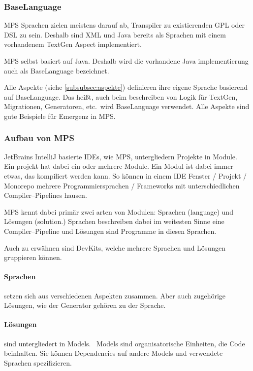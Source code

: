 \subsubsection{BaseLanguage}
\ac{MPS} Sprachen zielen meistens darauf ab, Transpiler zu existierenden \ac{GPL} oder \ac{DSL} zu sein.
Deshalb sind \ac{XML} und Java bereits als Sprachen mit einem vorhandenem TextGen Aspect implementiert.

\ac{MPS} selbst basiert auf Java.
Deshalb wird die vorhandene Java implementierung auch als BaseLanguage bezeichnet.

Alle Aspekte (siehe \autoref{subsubsec:aspekte}) definieren ihre eigene Sprache basierend auf BaseLanguage.
Das heißt, auch beim beschreiben von Logik für TextGen, Migrationen, Generatoren, etc.\ wird BaseLanguage verwendet.
Alle Aspekte sind gute Beispiele für Emergenz in \ac{MPS}.

\subsubsection{Aufbau von \acs{MPS}}
JetBrains IntelliJ basierte \acp{IDE}, wie \ac{MPS}, untergliedern Projekte in Module.~\autocite{jetbrains-sro-no-dateD}
Ein projekt hat dabei ein oder mehrere Module.
Ein Modul ist dabei immer etwas, das kompiliert werden kann.
So können in einem \ac{IDE} Fenster / Projekt / Monorepo mehrere Programmiersprachen / Frameworks mit unterschiedlichen Compiler--Pipelines hausen.

\ac{MPS} kennt dabei primär zwei arten von Modulen:
Sprachen (language) und Lösungen (solution.)
Sprachen beschreiben dabei im weitesten Sinne eine Compiler--Pipeline und Lösungen sind Programme in diesen Sprachen.

Auch zu erwähnen sind DevKits, welche mehrere Sprachen und Lösungen gruppieren können.

\paragraph{Sprachen} setzen sich aus verschiedenen Aspekten zusammen.
Aber auch zugehörige Lösungen, wie der Generator gehören zu der Sprache.

\paragraph{Lösungen} sind untergliedert in Models.~\autocite{jetbrains-sro-no-dateA}
Models sind organisatorische Einheiten, die Code beinhalten.
Sie können Dependencies auf andere Models und verwendete Sprachen spezifizieren.

